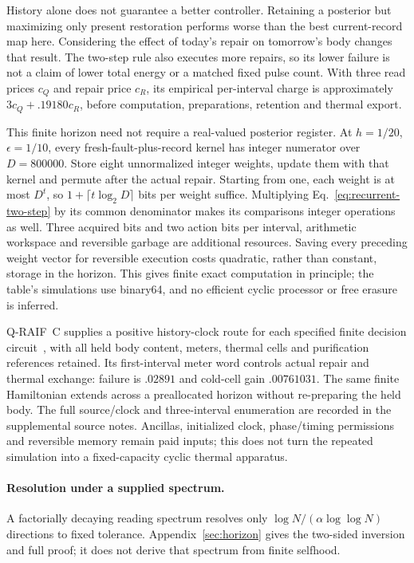 \documentclass[12pt]{article}
\theoremstyle{definition}
\theoremstyle{remark}
\begin{document}
History alone does not guarantee a better controller. Retaining a
posterior but maximizing only present restoration performs worse than
the best current-record map here. Considering the effect of today's
repair on tomorrow's body changes that result. The two-step rule also
executes more repairs, so its lower failure is not a claim of lower
total energy or a matched fixed pulse count. With three read prices
$c_Q$ and repair price $c_R$, its empirical per-interval charge is
approximately $3c_Q+.19180c_R$, before computation, preparations,
retention and thermal export.

This finite horizon need not require a real-valued posterior register.
At $h=1/20$, $\epsilon=1/10$, every fresh-fault-plus-record kernel has
integer numerator over $D=800000$. Store eight unnormalized integer
weights, update them with that kernel and permute after the actual
repair. Starting from one, each weight is at most $D^t$, so
$1+\lceil t\log_2D\rceil$ bits per weight suffice. Multiplying
Eq.~\eqref{eq:recurrent-two-step} by its common denominator makes
its comparisons integer operations as well. Three acquired bits and
two action bits per interval, arithmetic workspace and reversible
garbage are additional resources. Saving every preceding weight vector
for reversible execution costs quadratic, rather than constant,
storage in the horizon. This gives finite exact computation in principle;
the table's simulations use binary64, and no efficient cyclic processor
or free erasure is inferred.

Q-RAIF~C supplies a positive history-clock route for each specified
finite decision circuit~\cite{QRAIFC}, with all held body content,
meters, thermal cells and purification references retained.
Its first-interval meter word controls actual repair and thermal
exchange: failure is $.02891$ and cold-cell gain $.00761031$.
The same finite Hamiltonian extends across a preallocated horizon
without re-preparing the held body. The full source/clock and
three-interval enumeration are recorded in the supplemental source notes.
Ancillas, initialized clock, phase/timing permissions and reversible
memory remain paid inputs; this does not turn the repeated simulation
into a fixed-capacity cyclic thermal apparatus.

\paragraph{Resolution under a supplied spectrum.}
A factorially decaying reading spectrum resolves only
$\log N/(\alpha\log\log N)$ directions to fixed tolerance.
Appendix~\ref{sec:horizon} gives the two-sided inversion and full proof;
it does not derive that spectrum from finite selfhood.
\end{document}

